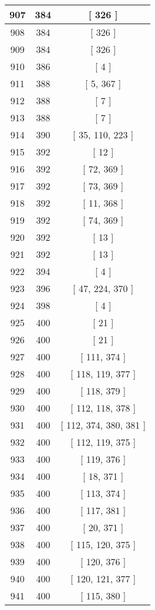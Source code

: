 \begin{center}
\begin{longtable}[H]{|| c c c ||}
\hline
907 & 384 & [ 326 ] \\ 
\hline
908 & 384 & [ 326 ] \\ 
\hline
909 & 384 & [ 326 ] \\ 
\hline
910 & 386 & [ 4 ] \\ 
\hline
911 & 388 & [ 5, 367 ] \\ 
\hline
912 & 388 & [ 7 ] \\ 
\hline
913 & 388 & [ 7 ] \\ 
\hline
914 & 390 & [ 35, 110, 223 ] \\ 
\hline
915 & 392 & [ 12 ] \\ 
\hline
916 & 392 & [ 72, 369 ] \\ 
\hline
917 & 392 & [ 73, 369 ] \\ 
\hline
918 & 392 & [ 11, 368 ] \\ 
\hline
919 & 392 & [ 74, 369 ] \\ 
\hline
920 & 392 & [ 13 ] \\ 
\hline
921 & 392 & [ 13 ] \\ 
\hline
922 & 394 & [ 4 ] \\ 
\hline
923 & 396 & [ 47, 224, 370 ] \\ 
\hline
924 & 398 & [ 4 ] \\ 
\hline
925 & 400 & [ 21 ] \\ 
\hline
926 & 400 & [ 21 ] \\ 
\hline
927 & 400 & [ 111, 374 ] \\ 
\hline
928 & 400 & [ 118, 119, 377 ] \\ 
\hline
929 & 400 & [ 118, 379 ] \\ 
\hline
930 & 400 & [ 112, 118, 378 ] \\ 
\hline
931 & 400 & [ 112, 374, 380, 381 ] \\ 
\hline
932 & 400 & [ 112, 119, 375 ] \\ 
\hline
933 & 400 & [ 119, 376 ] \\ 
\hline
934 & 400 & [ 18, 371 ] \\ 
\hline
935 & 400 & [ 113, 374 ] \\ 
\hline
936 & 400 & [ 117, 381 ] \\ 
\hline
937 & 400 & [ 20, 371 ] \\ 
\hline
938 & 400 & [ 115, 120, 375 ] \\ 
\hline
939 & 400 & [ 120, 376 ] \\ 
\hline
940 & 400 & [ 120, 121, 377 ] \\ 
\hline
941 & 400 & [ 115, 380 ] \\ 

\end{longtable}
\end{center}
